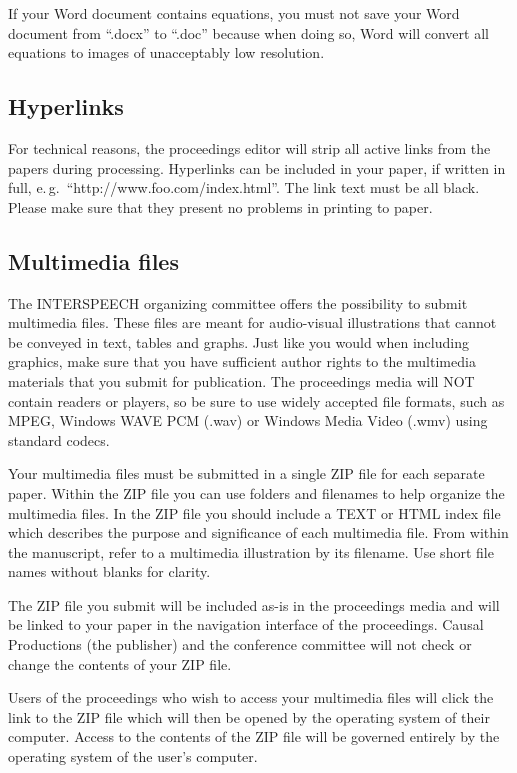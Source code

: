 If your Word document contains equations, you must not save your Word document from ``.docx'' to ``.doc'' because when doing so, Word will convert all equations to images of unacceptably low resolution.

\subsection{Hyperlinks}

For technical reasons, the proceedings editor will strip all active links from the papers during processing. Hyperlinks can be included in your paper, if written in full, e.\,g.\ ``http://www.foo.com/index.html''. The link text must be all black. 
Please make sure that they present no problems in printing to paper.

\subsection{Multimedia files}

The INTERSPEECH organizing committee offers the possibility to submit multimedia files. These files are meant for audio-visual illustrations that cannot be conveyed in text, tables and graphs. Just like you would when including graphics, make sure that you have sufficient author rights to the multimedia materials that you submit for publication. The proceedings media will NOT contain readers or players, so be sure to use widely accepted file formats, such as MPEG, Windows WAVE PCM (.wav) or Windows Media Video (.wmv) using standard codecs.

Your multimedia files must be submitted in a single ZIP file for each separate paper. Within the ZIP file you can use folders and filenames to help organize the multimedia files. In the ZIP file you should include a TEXT or HTML index file which describes the purpose and significance of each multimedia file. From within the manuscript, refer to a multimedia illustration by its filename. Use short file names without blanks for clarity.

The ZIP file you submit will be included as-is in the proceedings media and will be linked to your paper in the navigation interface of the proceedings. Causal Productions (the publisher) and the conference committee will not check or change the contents of your ZIP file.

Users of the proceedings who wish to access your multimedia files will click the link to the ZIP file which will then be opened by the operating system of their computer. Access to the contents of the ZIP file will be governed entirely by the operating system of the user's computer.

